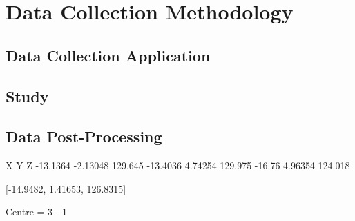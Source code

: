 \section{Data Collection Methodology} %

\subsection{Data Collection Application}

\subsection{Study}

\subsection{Data Post-Processing}


%

X           Y           Z
-13.1364    -2.13048    129.645
-13.4036    4.74254     129.975
-16.76      4.96354     124.018

[-14.9482, 1.41653, 126.8315]

Centre = 3 - 1
